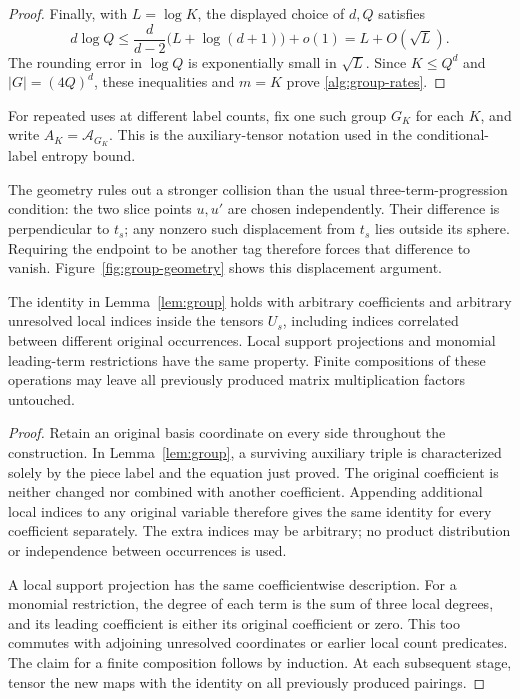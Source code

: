 \begin{proof}
Finally, with \(L=\log K\), the displayed choice of \(d,Q\) satisfies
\[
 d\log Q
 \leq\frac{d}{d-2}\bigl(L+\log(d+1)\bigr)+o(1)
 =L+O(\sqrt L).
\]
The rounding error in \(\log Q\) is exponentially small in
\(\sqrt L\).  Since \(K\leq Q^d\) and
\(|G|=(4Q)^d\), these inequalities and \(m=K\) prove
\eqref{alg:group-rates}.
\end{proof}

For repeated uses at different label counts, fix one such group \(G_K\)
for each \(K\), and write \(A_K=\mathcal A_{G_K}\).  This is the
auxiliary-tensor notation used in the conditional-label entropy bound.

The geometry rules out a stronger collision than the usual
three-term-progression condition: the two slice points \(u,u'\) are chosen
independently.  Their difference is perpendicular to \(t_s\); any nonzero
such displacement from \(t_s\) lies outside its sphere.  Requiring the
endpoint to be another tag therefore forces that difference to vanish.
Figure~\ref{fig:group-geometry} shows this displacement argument.



\begin{lemma}
\label{alg:payload}
The identity in Lemma~\ref{lem:group} holds with arbitrary coefficients
and arbitrary unresolved local indices inside the tensors \(U_s\),
including indices correlated between different original occurrences.
Local support projections and monomial leading-term restrictions have the
same property.  Finite compositions of these operations may leave all
previously produced matrix multiplication factors untouched.
\end{lemma}
\begin{proof}
Retain an original basis coordinate on every side throughout the
construction.  In Lemma~\ref{lem:group}, a surviving auxiliary triple is
characterized solely by the piece label and the equation just proved.
The original coefficient is neither changed nor combined with another
coefficient.  Appending additional local indices to any original variable
therefore gives the same identity for every coefficient separately.  The
extra indices may be arbitrary; no product distribution or independence
between occurrences is used.

A local support projection has the same coefficientwise description.
For a monomial restriction, the degree of each term is the sum of three
local degrees, and its leading coefficient is either its original
coefficient or zero.  This too commutes with adjoining unresolved
coordinates or earlier local count predicates.  The claim for a finite
composition follows by induction.  At each subsequent stage, tensor the
new maps with the identity on all previously produced pairings.
\end{proof}

